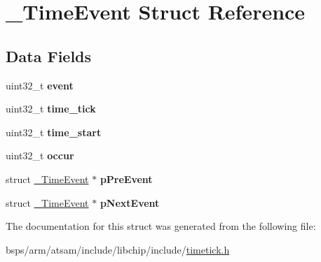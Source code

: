 \hypertarget{struct__TimeEvent}{}\section{\+\_\+\+Time\+Event Struct Reference}
\label{struct__TimeEvent}
\subsection*{Data Fields}
\begin{DoxyCompactItemize}
\item 
\mbox{\label{struct__TimeEvent_a6666c104269fb10cb9ccf4c0fdd85219}} 
uint32\+\_\+t {\bfseries event}
\item 
\mbox{\label{struct__TimeEvent_af49237feea84648b77f67fc42406eda6}} 
uint32\+\_\+t {\bfseries time\+\_\+tick}
\item 
\mbox{\label{struct__TimeEvent_a18f41b7a6e37e4f4d3c26f5746306115}} 
uint32\+\_\+t {\bfseries time\+\_\+start}
\item 
\mbox{\label{struct__TimeEvent_a649cc0085ea46b932e39516ed028890c}} 
uint32\+\_\+t {\bfseries occur}
\item 
\mbox{\label{struct__TimeEvent_a5c47f2622ea44aae508778ef5584dab6}} 
struct \mbox{\hyperlink{struct__TimeEvent}{\+\_\+\+Time\+Event}} $\ast$ {\bfseries p\+Pre\+Event}
\item 
\mbox{\label{struct__TimeEvent_a0d8fb43d39542717589ade83dcaa772a}} 
struct \mbox{\hyperlink{struct__TimeEvent}{\+\_\+\+Time\+Event}} $\ast$ {\bfseries p\+Next\+Event}
\end{DoxyCompactItemize}


The documentation for this struct was generated from the following file\+:\begin{DoxyCompactItemize}
\item 
bsps/arm/atsam/include/libchip/include/\mbox{\hyperlink{timetick_8h}{timetick.\+h}}\end{DoxyCompactItemize}

